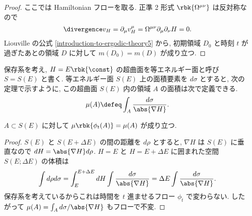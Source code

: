 \documentclass[openany, a4paper, oneside]{jsbook}
\begin{document}
{\begin{proof}
ここでは Hamiltonian フローを取る.
正準 2 形式 $\rbk{\Omega^{\mu \nu}}$ は反対称なので
\begin{align}
 \divergence v_{H}
 =
 \partial_{\mu} v^{\mu}_H
 =
 \Omega^{\mu \nu} \partial_{\mu} \partial_{\nu} H
 = 0.
\end{align}
Liouville の公式 \ref{introduction-to-ergodic-theory5} から,
初期領域 $D_0$ と時刻 $t$ が過ぎたあとの領域 $D$ に対して
$m(D_0) = m(D)$ が成り立つ.
\end{proof}
保存系を考え, $H = E \rbk{ \const }$ の超曲面を等エネルギー面と呼び $S = S(E)$ と書く.
等エネルギー面 $S(E)$ 上の面積要素を $d \sigma$ とすると,
次の定理で示すように, この超曲面 $S(E)$ 内の領域 $A$ の面積は次で定義できる.
\begin{align}
 \mu (A)
 \defeq
 \int_{A} \frac{d \sigma}{\abs{\nabla H}}.
\end{align}
\begin{thm}\label{introduction-to-ergodic-theory20}
$A \subset S(E)$ に対して $\mu \rbk{\phi_t (A)} = \mu (A)$ が成り立つ.
\end{thm}
\begin{proof}
$S (E)$ と $S(E + \Delta E)$ の間の距離を $d \rho$ とすると,
$\nabla H$ は $S(E)$ に垂直なので $dH = \abs{\nabla H} d \rho$.
$H = E$ と $H = E + \Delta E$ に囲まれた空間 $S(E; \Delta E)$ の体積は
\begin{align}
 \int d \rho d \sigma
 =
 \int_{E}^{E + \Delta E} dH \int \frac{d \sigma}{\abs{\nabla H}}
 =
 \Delta E \int \frac{d \sigma}{\abs{\nabla H}}.
\end{align}
保存系を考えているからこれは時間を $t$ 進ませるフロー $\phi_t$ で変わらない.
したがって $\mu (A) = \int_A d \sigma / \abs{\nabla H}$ もフローで不変.
\end{proof}

}
\end{document}
